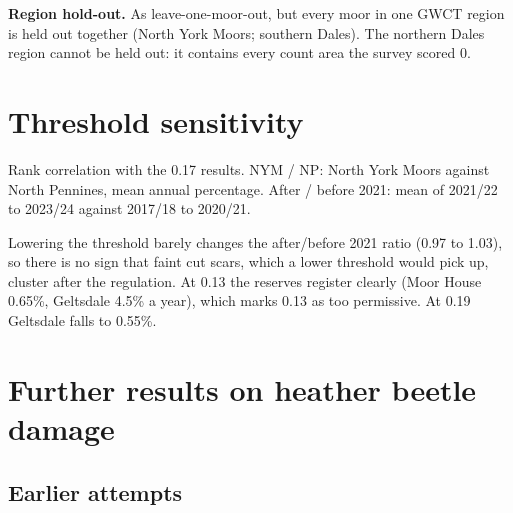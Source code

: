 \documentclass[11pt,a4paper]{article}
\begin{document}
\textbf{Region hold-out.} As leave-one-moor-out, but every moor in one GWCT region is held out together (North York Moors; southern Dales). The northern Dales region cannot be held out: it contains every count area the survey scored 0.

\clearpage
\section{Threshold sensitivity}\label{app:thresholds}

\begin{table}[H]
\centering
\caption{Main results at four detection thresholds.}\label{tab:thresholds}
\footnotesize
\setlength{\tabcolsep}{4.5pt}
\begin{threeparttable}

\begin{tablenotes}\footnotesize
\item[a] Rank correlation with the 0.17 results. NYM / NP: North York Moors against North Pennines, mean annual percentage. After / before 2021: mean of 2021/22 to 2023/24 against 2017/18 to 2020/21.
\end{tablenotes}
\end{threeparttable}
\end{table}

Lowering the threshold barely changes the after/before 2021 ratio (0.97 to 1.03), so there is no sign that faint cut scars, which a lower threshold would pick up, cluster after the regulation. At 0.13 the reserves register clearly (Moor House 0.65\%, Geltsdale 4.5\% a year), which marks 0.13 as too permissive. At 0.19 Geltsdale falls to 0.55\%.

\section{Further results on heather beetle damage}\label{app:beetle}

\subsection{Earlier attempts}\label{app:beetle-early}
\end{document}
